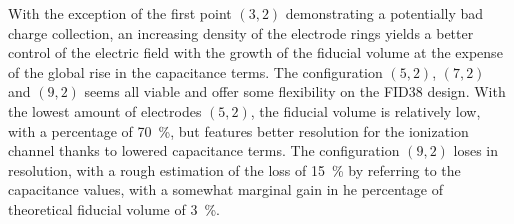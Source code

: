 With the exception of the first point $(3,2)$ demonstrating a potentially bad charge collection, an increasing density of the electrode rings yields a better control of the electric field with the growth of the fiducial volume at the expense of the global rise in the capacitance terms. The configuration $(5,2)$, $(7,2)$ and $(9,2)$ seems all viable and offer some flexibility on the FID38 design. With the lowest amount of electrodes $(5,2)$, the fiducial volume is relatively low, with a percentage of \SI{70}{\percent}, but features better resolution for the ionization channel thanks to lowered capacitance terms. The configuration $(9,2)$ loses in resolution, with a rough estimation of the loss of \SI{15}{\percent} by referring to the capacitance values, with a somewhat marginal gain in he percentage of theoretical fiducial volume of \SI{3}{\percent}.
